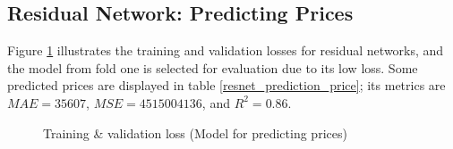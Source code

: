 \documentclass[12pt,twoside]{report}
\begin{document}
\subsection{Residual Network: Predicting Prices}
Figure \ref{all_resnet_full_epoch_1000} illustrates the training and validation losses for residual networks, and the model from fold one is selected for evaluation due to its low loss. Some predicted prices are displayed in table \ref{resnet_prediction_price}; its metrics are $MAE = 35607$, $MSE = 4515004136$, and $R^2 = 0.86$. 
\begin{figure}[!htbp]
	\centering
	\hfill
	\hfill
	\hfil
	\hfil
	\caption{Training \& validation loss (Model for predicting prices)}
	\label{all_resnet_full_epoch_1000}
\end{figure}
\end{document}
